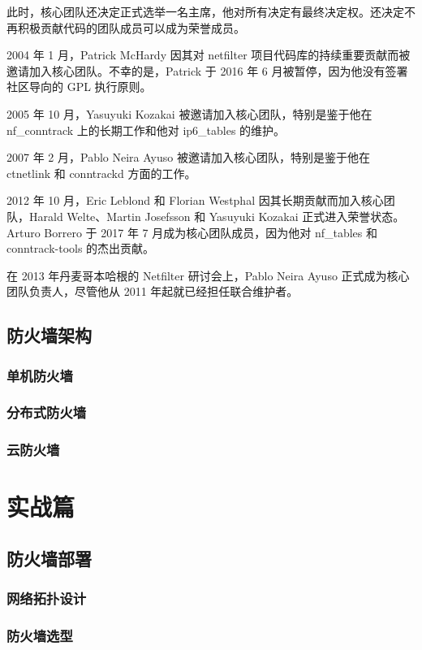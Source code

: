 \documentclass[12pt,UTF8]{ctexbook}
\begin{document}
此时，核心团队还决定正式选举一名主席，他对所有决定有最终决定权。还决定不再积极贡献代码的团队成员可以成为荣誉成员。

2004 年 1 月，Patrick McHardy 因其对 netfilter 项目代码库的持续重要贡献而被邀请加入核心团队。不幸的是，Patrick 于 2016 年 6 月被暂停，因为他没有签署社区导向的 GPL 执行原则。

2005 年 10 月，Yasuyuki Kozakai 被邀请加入核心团队，特别是鉴于他在 nf\_conntrack 上的长期工作和他对 ip6\_tables 的维护。

2007 年 2 月，Pablo Neira Ayuso 被邀请加入核心团队，特别是鉴于他在 ctnetlink 和 conntrackd 方面的工作。

2012 年 10 月，Eric Leblond 和 Florian Westphal 因其长期贡献而加入核心团队，Harald Welte、Martin Josefsson 和 Yasuyuki Kozakai 正式进入荣誉状态。Arturo Borrero 于 2017 年 7 月成为核心团队成员，因为他对 nf\_tables 和 conntrack-tools 的杰出贡献。

在 2013 年丹麦哥本哈根的 Netfilter 研讨会上，Pablo Neira Ayuso 正式成为核心团队负责人，尽管他从 2011 年起就已经担任联合维护者。

\chapter{防火墙架构}
\section{单机防火墙}
\section{分布式防火墙}
\section{云防火墙}

\part{实战篇}
\chapter{防火墙部署}
\section{网络拓扑设计}
\section{防火墙选型}
\end{document}
